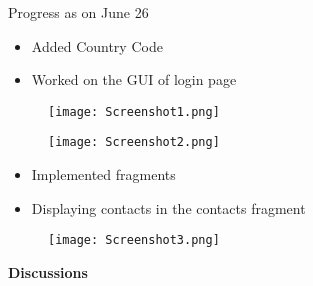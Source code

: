 \documentclass{beamer}
\begin{document}
\begin{frame}{Progress as on June 26}
\begin{itemize}
    \item Added Country Code
    \item Worked on the GUI of login page
\end{itemize}
    
\end{frame}
\begin{frame}
\begin{figure}[H]
\centering
\texttt{[image: Screenshot1.png]}
\end{figure}

\end{frame}

\begin{frame}
\begin{figure}[H]
\centering
\texttt{[image: Screenshot2.png]}
\end{figure}
\end{frame}
\begin{frame}{}
\begin{itemize}
    \item Implemented fragments
    \item Displaying contacts in the contacts fragment
\end{itemize}
    
\end{frame}
\begin{frame}
\begin{figure}[H]
\centering
\texttt{[image: Screenshot3.png]}
\end{figure}
\end{frame}


\begin{frame}
\textbf{Discussions}
\end{frame}
\end{document}
